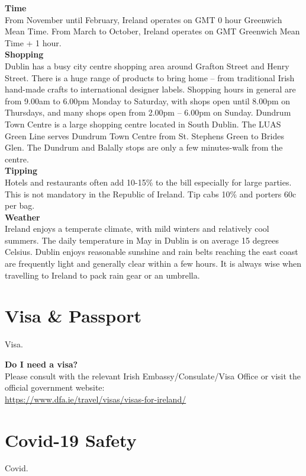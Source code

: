 {\large \textbf{Time}\\
\normalsize
From November until February, Ireland operates on GMT 0 hour Greenwich Mean Time. From March to October, Ireland operates on GMT Greenwich Mean Time + 1 hour.\\

{\large \textbf{Shopping}}\\
Dublin has a busy city centre shopping area around Grafton Street and Henry Street. There is a huge range of products to bring home – from traditional Irish hand-made crafts to international designer labels. Shopping hours in general are from 9.00am to 6.00pm Monday to Saturday, with shops open until 8.00pm on Thursdays, and many shops open from 2.00pm – 6.00pm on Sunday. Dundrum Town Centre is a large shopping centre located in South Dublin. The LUAS Green Line serves Dundrum Town Centre from St. Stephens Green to Brides Glen. The Dundrum and Balally stops are only a few minutes-walk from the centre.\\

{\large \textbf{Tipping}}\\
Hotels and restaurants often add 10-15\% to the bill especially for large parties. This is not mandatory in the Republic of Ireland. Tip cabs 10\% and porters 60c per bag.\\

{\large \textbf{Weather}}\\
Ireland enjoys a temperate climate, with mild winters and relatively cool summers. The daily temperature in May in Dublin is on average 15 degrees Celsius.
Dublin enjoys reasonable sunshine and rain belts reaching the east coast are frequently light and generally clear within a few hours. It is always wise when travelling to Ireland to pack rain gear or an umbrella.\\

\section{Visa \& Passport}
Visa.

{\large \textbf{Do I need a visa?}}\\
Please consult with the relevant Irish Embassy/Consulate/Visa Office or visit the official government website: \\
\url{https://www.dfa.ie/travel/visas/visas-for-ireland/}

 \leavevmode\newline
\section{Covid-19 Safety}
Covid.

}
